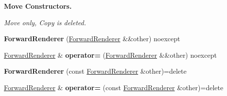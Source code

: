 \begin{Indent}\textbf{ Move Constructors.}\par
{\em Move only, Copy is deleted. }\begin{DoxyCompactItemize}
\item 
\mbox{\label{classblaze_1_1ForwardRenderer_a0a6c8cf08a058fe3fbd25b9ecdc3c28b}} 
{\bfseries Forward\+Renderer} (\hyperlink{classblaze_1_1ForwardRenderer}{Forward\+Renderer} \&\&other) noexcept
\item 
\mbox{\label{classblaze_1_1ForwardRenderer_a027a5ab5ab27a6248c40eaa57ecd140d}} 
\hyperlink{classblaze_1_1ForwardRenderer}{Forward\+Renderer} \& {\bfseries operator=} (\hyperlink{classblaze_1_1ForwardRenderer}{Forward\+Renderer} \&\&other) noexcept
\item 
\mbox{\label{classblaze_1_1ForwardRenderer_a6b60ffa32fc81b846ce05729e000693e}} 
{\bfseries Forward\+Renderer} (const \hyperlink{classblaze_1_1ForwardRenderer}{Forward\+Renderer} \&other)=delete
\item 
\mbox{\label{classblaze_1_1ForwardRenderer_a3a9d723f9618259735a292a264ebcf05}} 
\hyperlink{classblaze_1_1ForwardRenderer}{Forward\+Renderer} \& {\bfseries operator=} (const \hyperlink{classblaze_1_1ForwardRenderer}{Forward\+Renderer} \&other)=delete
\end{DoxyCompactItemize}
\end{Indent}

